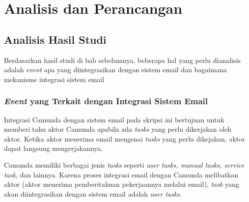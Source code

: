 \chapter{Analisis dan Perancangan}
\label{chap:analisisdanperancangan}

\section{Analisis Hasil Studi}
Berdasarkan hasil studi di bab sebelumnya, beberapa hal yang perlu dianalisis adalah \textit{event} apa yang diintegrasikan dengan sistem email dan bagaimana mekanisme integrasi sistem email
\subsection{\textit{Event} yang Terkait dengan Integrasi Sistem Email}
\label{sec:eventUserTask}

Integrasi Camunda dengan sistem email pada skripsi ini bertujuan untuk memberi tahu aktor Camunda apabila ada \textit{tasks} yang perlu dikerjakan oleh aktor. Ketika aktor menerima email mengenai \textit{tasks} yang perlu dikejakan, aktor dapat langsung mengerjakannya. 

Camunda memiliki berbagai jenis \textit{tasks} seperti \textit{user tasks, manual tasks, service task}, dan lainnya. Karena proses integrasi email dengan Camunda melibatkan aktor (aktor menerima pemberitahuan pekerjaannya melalui email), \textit{task} yang akan diintegrasikan dengan sistem email adalah \textit{user tasks}.


